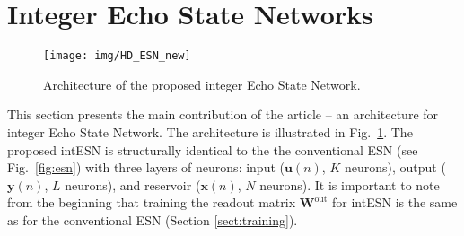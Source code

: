 \section{Integer Echo State Networks}
\label{sect:intesn}
% 



\begin{figure}[tb]%
\centering
\texttt{[image: img/HD\_ESN\_new]}
\caption{Architecture of the proposed integer Echo State Network.}
\label{fig:intesn}
\end{figure}

This section presents the main contribution of the article -- an architecture for integer Echo State Network. 
The architecture is illustrated in Fig.~\ref{fig:intesn}. The proposed intESN is structurally identical to the the conventional ESN (see Fig.~\ref{fig:esn}) with three layers of neurons: input ($\textbf{u}(n)$, $K$ neurons), output ($\textbf{y}(n)$, $L$ neurons), and reservoir ($\textbf{x}(n)$, $N$ neurons). It is important to note from the beginning that training the readout matrix $\textbf{W}^{\text{out}}$  for intESN is the same as for the conventional ESN (Section \ref{sect:training}). 

